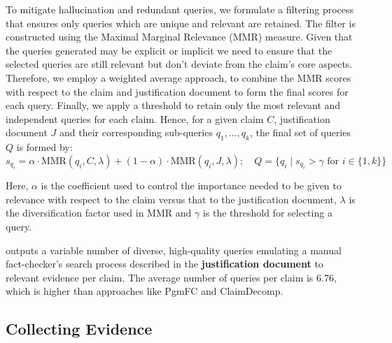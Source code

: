 To mitigate hallucination and redundant queries, we formulate a filtering process that ensures only queries which are unique and relevant are retained. The filter is constructed using the Maximal Marginal Relevance (MMR) measure.
Given that the queries generated may be explicit or implicit we need to ensure that the selected queries are still relevant but don’t deviate from the claim's core aspects. Therefore, we employ a weighted average approach, to combine the MMR scores with respect to the claim and justification document to form the final scores for each query. Finally, we apply a threshold to retain only the most relevant and independent queries for each claim. Hence, for a given claim \( C \), justification document \( J \) and their corresponding sub-queries \( q_1, \ldots, q_k \), the final set of queries \( Q \) is formed by:
\[
s_{q_i} = \alpha \cdot \text{MMR}(q_{i}, C,\lambda) + (1-\alpha) \cdot \text{MMR}(q_{i}, J,\lambda) ; \quad Q = \{ q_i \mid s_{q_i} > \gamma \text{ for } i \in \{1, k\} \}
\]


Here, \(\alpha\)  is the coefficient used to control the importance needed to be given to relevance with respect to the claim versus that to the justification document, \(\lambda\) is the diversification factor used in MMR and \(\gamma\) is the threshold for selecting a query.

\name{} outputs a variable number of diverse, high-quality queries emulating a manual fact-checker's search process described in the \textbf{justification document} to relevant evidence per claim. The average number of queries per claim is 6.76, which is higher than approaches like PgmFC\cite{programFC} and ClaimDecomp\cite{claimdecomp}. 

\subsection{Collecting Evidence}

